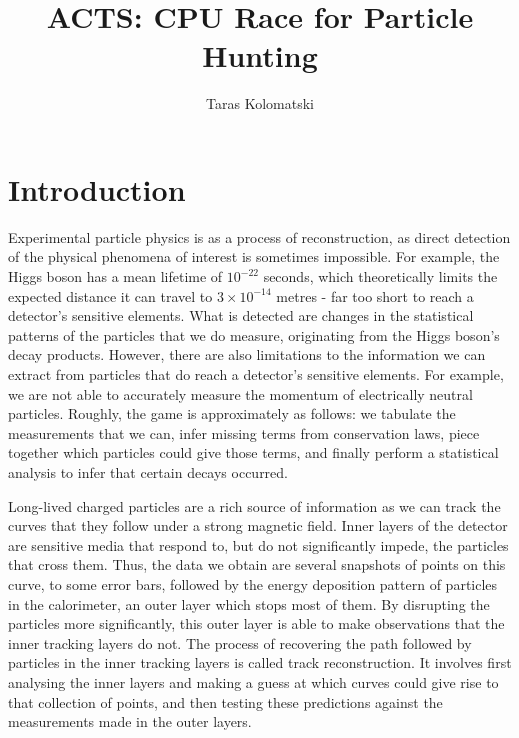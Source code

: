 \documentclass[12pt]{amsart}
\title{ACTS: CPU Race for Particle Hunting}
\date{\vspace{-1.0cm}Taras Kolomatski}
\begin{document}
\maketitle

\thispagestyle{empty}

\vspace{-0.4cm}

\section*{Introduction}

Experimental particle physics is as a process of reconstruction, as direct detection of the physical phenomena of interest is sometimes impossible. For example, the Higgs boson has a mean lifetime of $10^{-22}$ seconds, which theoretically limits the expected distance it can travel to $3 \times 10^{-14}$ metres - far too short to reach a detector's sensitive elements. What is detected are changes in the statistical patterns of the particles that we do measure, originating from the Higgs boson's decay products. However, there are also limitations to the information we can extract from particles that do reach a detector's sensitive elements. For example, we are not able to accurately measure the momentum of electrically neutral particles. Roughly, the game is approximately as follows: we tabulate the measurements that we can, infer missing terms from conservation laws, piece together which particles could give those terms, and finally perform a statistical analysis to infer that certain decays occurred.

Long-lived charged particles are a rich source of information as we can track the curves that they follow under a strong magnetic field. Inner layers of the detector are sensitive media that respond to, but do not significantly impede, the particles that cross them. Thus, the data we obtain are several snapshots of points on this curve, to some error bars, followed by the energy deposition pattern of particles in the calorimeter, an outer layer which stops most of them. By disrupting the particles more significantly, this outer layer is able to make observations that the inner tracking layers do not. The process of recovering the path followed by particles in the inner tracking layers is called track reconstruction. It involves first analysing the inner layers and making a guess at which curves could give rise to that collection of points, and then testing these predictions against the measurements made in the outer layers.
\end{document}
